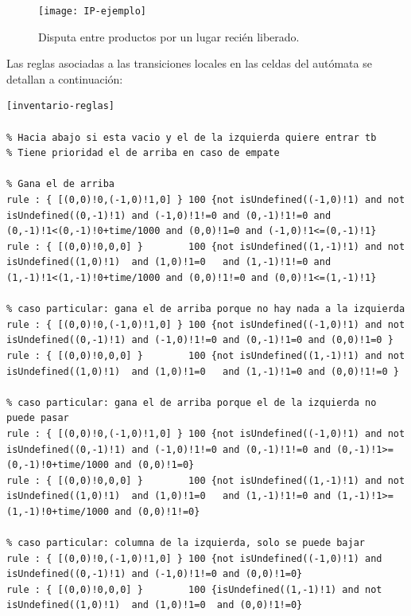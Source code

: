 \documentclass[10pt]{article}
\begin{document}
\begin{figure}[h] 
	\centering 
	\texttt{[image: IP-ejemplo]} 
	\caption{Disputa entre productos por un lugar recién liberado.} 
	\label{fig:IP-ejemplo} 
\end{figure}
\FloatBarrier

Las reglas asociadas a las transiciones locales en las celdas del autómata se detallan a continuación:

\begin{minipage}{1\textwidth}
	\centering
	\begin{lstlisting}
[inventario-reglas]

% Hacia abajo si esta vacio y el de la izquierda quiere entrar tb
% Tiene prioridad el de arriba en caso de empate

% Gana el de arriba
rule : { [(0,0)!0,(-1,0)!1,0] } 100 {not isUndefined((-1,0)!1) and not isUndefined((0,-1)!1) and (-1,0)!1!=0 and (0,-1)!1!=0 and (0,-1)!1<(0,-1)!0+time/1000 and (0,0)!1=0 and (-1,0)!1<=(0,-1)!1}
rule : { [(0,0)!0,0,0] }        100 {not isUndefined((1,-1)!1) and not isUndefined((1,0)!1)  and (1,0)!1=0   and (1,-1)!1!=0 and (1,-1)!1<(1,-1)!0+time/1000 and (0,0)!1!=0 and (0,0)!1<=(1,-1)!1}

% caso particular: gana el de arriba porque no hay nada a la izquierda
rule : { [(0,0)!0,(-1,0)!1,0] } 100 {not isUndefined((-1,0)!1) and not isUndefined((0,-1)!1) and (-1,0)!1!=0 and (0,-1)!1=0 and (0,0)!1=0 }
rule : { [(0,0)!0,0,0] }        100 {not isUndefined((1,-1)!1) and not isUndefined((1,0)!1)  and (1,0)!1=0   and (1,-1)!1=0 and (0,0)!1!=0 }

% caso particular: gana el de arriba porque el de la izquierda no puede pasar
rule : { [(0,0)!0,(-1,0)!1,0] } 100 {not isUndefined((-1,0)!1) and not isUndefined((0,-1)!1) and (-1,0)!1!=0 and (0,-1)!1!=0 and (0,-1)!1>=(0,-1)!0+time/1000 and (0,0)!1=0}
rule : { [(0,0)!0,0,0] }        100 {not isUndefined((1,-1)!1) and not isUndefined((1,0)!1)  and (1,0)!1=0   and (1,-1)!1!=0 and (1,-1)!1>=(1,-1)!0+time/1000 and (0,0)!1!=0}

% caso particular: columna de la izquierda, solo se puede bajar
rule : { [(0,0)!0,(-1,0)!1,0] } 100 {not isUndefined((-1,0)!1) and isUndefined((0,-1)!1) and (-1,0)!1!=0 and (0,0)!1=0}
rule : { [(0,0)!0,0,0] }        100 {isUndefined((1,-1)!1) and not isUndefined((1,0)!1)  and (1,0)!1=0  and (0,0)!1!=0}
	\end{lstlisting}
\end{minipage}
\end{document}
